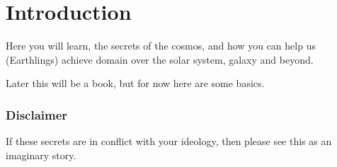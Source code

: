 \documentclass{report}
\begin{document}
\chapter{Introduction}
Here you will learn, the secrets of the cosmos, 
and how you can help us (Earthlings) achieve domain over the solar system, galaxy and
beyond.  

Later this will be a book, but for now here are some basics. 

\subsection{Disclaimer} 
If these secrets are in conflict with your ideology,
then please see this as an imaginary story. 
\end{document}
